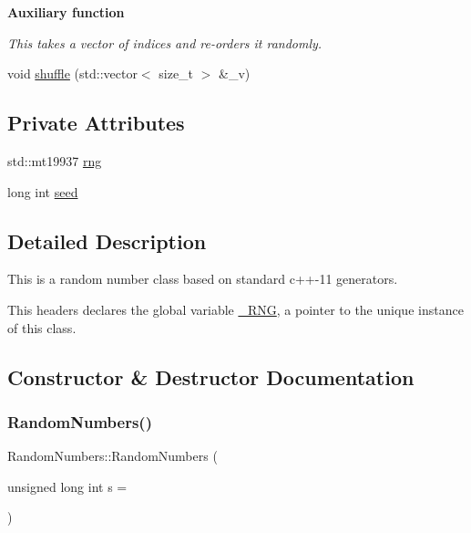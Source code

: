 \begin{Indent}\textbf{ Auxiliary function}\par
{\em This takes a vector of indices and re-\/orders it randomly. }\begin{DoxyCompactItemize}
\item 
void \hyperlink{classRandomNumbers_a851aaa7e46922dc22ce984b21b474a4e}{shuffle} (std\+::vector$<$ size\+\_\+t $>$ \&\+\_\+v)
\end{DoxyCompactItemize}
\end{Indent}
\subsection*{Private Attributes}
\begin{DoxyCompactItemize}
\item 
std\+::mt19937 \hyperlink{classRandomNumbers_a15ceee85d6d00de12ae76c90aaec2f14}{rng}
\item 
long int \hyperlink{classRandomNumbers_a83c563bc5ca60f2e5c149244b327d948}{seed}
\end{DoxyCompactItemize}


\subsection{Detailed Description}
This is a random number class based on standard c++-\/11 generators.

This headers declares the global variable \hyperlink{main_8cpp}{\+\_\+\+R\+NG}, a pointer to the unique instance of this class. 

\subsection{Constructor \& Destructor Documentation}
\mbox{\label{classRandomNumbers_aeceac66b253ad00f58e7b2252f18f609}} 
\subsubsection{\texorpdfstring{Random\+Numbers()}{RandomNumbers()}}
{\footnotesize\ttfamily Random\+Numbers\+::\+Random\+Numbers (\begin{DoxyParamCaption}\item[{unsigned long int}]{s = {} }\end{DoxyParamCaption})}


